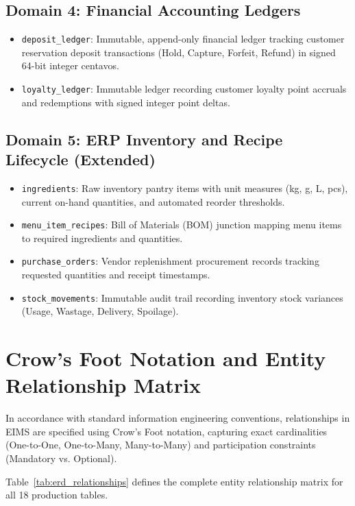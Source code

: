 \subsection{Domain 4: Financial Accounting Ledgers}
\begin{itemize}
    \item \texttt{deposit\_ledger}: Immutable, append-only financial ledger tracking customer reservation deposit transactions (Hold, Capture, Forfeit, Refund) in signed 64-bit integer centavos.
    \item \texttt{loyalty\_ledger}: Immutable ledger recording customer loyalty point accruals and redemptions with signed integer point deltas.
\end{itemize}

\subsection{Domain 5: ERP Inventory and Recipe Lifecycle (Extended)}
\begin{itemize}
    \item \texttt{ingredients}: Raw inventory pantry items with unit measures (kg, g, L, pcs), current on-hand quantities, and automated reorder thresholds.
    \item \texttt{menu\_item\_recipes}: Bill of Materials (BOM) junction mapping menu items to required ingredients and quantities.
    \item \texttt{purchase\_orders}: Vendor replenishment procurement records tracking requested quantities and receipt timestamps.
    \item \texttt{stock\_movements}: Immutable audit trail recording inventory stock variances (Usage, Wastage, Delivery, Spoilage).
\end{itemize}

\section{Crow's Foot Notation and Entity Relationship Matrix}
\label{sec:erd_crows_foot}
In accordance with standard information engineering conventions, relationships in EIMS are specified using Crow's Foot notation, capturing exact cardinalities (One-to-One, One-to-Many, Many-to-Many) and participation constraints (Mandatory vs. Optional).

Table~\ref{tab:erd_relationships} defines the complete entity relationship matrix for all 18 production tables.

